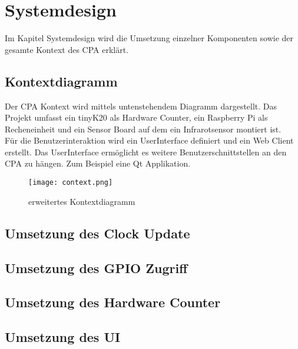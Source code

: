 \section{Systemdesign}
    Im Kapitel Systemdesign wird die Umsetzung einzelner Komponenten sowie der gesamte Kontext des CPA erklärt.
        \subsection{Kontextdiagramm}
        Der CPA Kontext wird mittels untenstehendem Diagramm dargestellt. Das Projekt umfasst ein tinyK20 als Hardware Counter, ein Raspberry Pi als Recheneinheit und ein Sensor Board auf dem ein Infrarotsensor montiert ist.\\
        Für die Benutzerinteraktion wird ein UserInterface definiert und ein Web Client erstellt. Das UserInterface ermöglicht es weitere Benutzerschnittstellen an den CPA zu hängen. Zum Beispiel eine Qt Applikation.
        \begin{figure}[H]
            \centering
            \texttt{[image: context.png]}
            \caption{erweitertes Kontextdiagramm}
        \end{figure}

    	\subsection{Umsetzung des Clock Update} %
		\subsection{Umsetzung des GPIO Zugriff} %
		\subsection{Umsetzung des Hardware Counter} %
        
        \subsection{Umsetzung des UI} %
        \clearpage
        
        \clearpage
		
